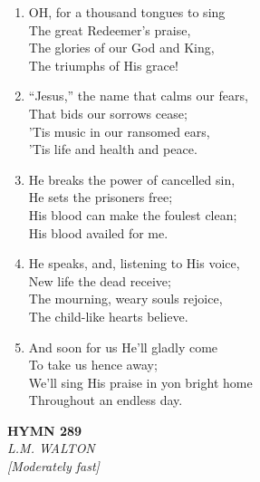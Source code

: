 \documentclass[11pt,a4paper]{article}
\begin{document}
\begin{enumerate}
    \item OH, for a thousand tongues to sing \\
        The great Redeemer's praise, \\
        The glories of our God and King, \\
        The triumphs of His grace!

    \item ``Jesus,'' the name that calms our fears, \\
        That bids our sorrows cease; \\
        'Tis music in our ransomed ears, \\
        'Tis life and health and peace.

    \item He breaks the power of cancelled sin, \\
        He sets the prisoners free; \\
        His blood can make the foulest clean; \\
        His blood availed for me.

    \item He speaks, and, listening to His voice, \\
        New life the dead receive; \\
        The mourning, weary souls rejoice, \\
        The child-like hearts believe.

    \item And soon for us He'll gladly come \\
        To take us hence away; \\
        We'll sing His praise in yon bright home \\
        Throughout an endless day.

\end{enumerate}

\newpage
\begin{center}
    {\Large \textbf{HYMN 289}}
    \\
    \textit{L.M. WALTON}
    \\
    \textit{\small [Moderately fast]}
\end{center}
\vspace{1em}
\end{document}
